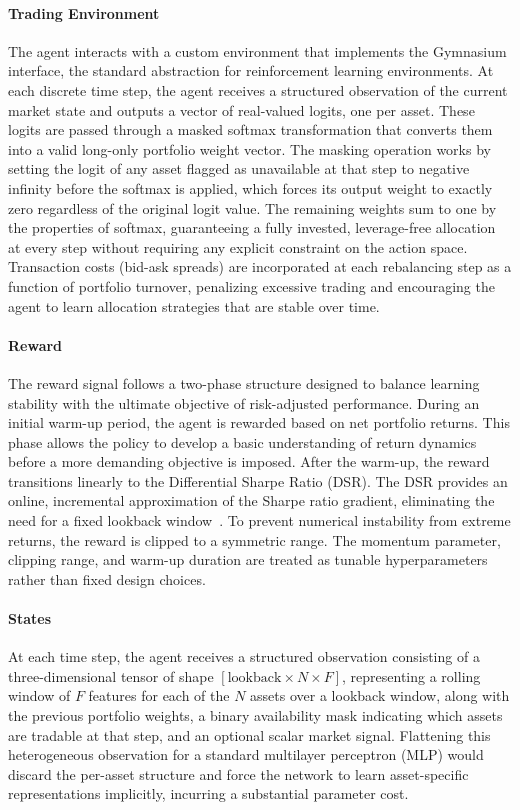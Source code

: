 \paragraph{Trading Environment} The agent interacts with a custom environment that implements the Gymnasium interface, the standard abstraction for reinforcement learning environments. At each discrete time step, the agent receives a structured observation of the current market state and outputs a vector of real-valued logits, one per asset. These logits are passed through a masked softmax transformation that converts them into a valid long-only portfolio weight vector. The masking operation works by setting the logit of any asset flagged as unavailable at that step to negative infinity before the softmax is applied, which forces its output weight to exactly zero regardless of the original logit value. The remaining weights sum to one by the properties of softmax, guaranteeing a fully invested, leverage-free allocation at every step without requiring any explicit constraint on the action space. Transaction costs (bid-ask spreads) are incorporated at each rebalancing step as a function of portfolio turnover, penalizing excessive trading and encouraging the agent to learn allocation strategies that are stable over time.

\paragraph{Reward} The reward signal follows a two-phase structure designed to balance learning stability with the ultimate objective of risk-adjusted performance. During an initial warm-up period, the agent is rewarded based on net portfolio returns. This phase allows the policy to develop a basic understanding of return dynamics before a more demanding objective is imposed. After the warm-up, the reward transitions linearly to the Differential Sharpe Ratio (DSR). The DSR provides an online, incremental approximation of the Sharpe ratio gradient, eliminating the need for a fixed lookback window~\cite{dsratio, 0df79}. To prevent numerical instability from extreme returns, the reward is clipped to a symmetric range. The momentum parameter, clipping range, and warm-up duration are treated as tunable hyperparameters rather than fixed design choices.

\paragraph{States} At each time step, the agent receives a structured observation consisting of a three-dimensional tensor of shape $[\text{lookback} \times N \times F]$, representing a rolling window of $F$ features for each of the $N$ assets over a lookback window, along with the previous portfolio weights, a binary availability mask indicating which assets are tradable at that step, and an optional scalar market signal. Flattening this heterogeneous observation for a standard multilayer perceptron (MLP) would discard the per-asset structure and force the network to learn asset-specific representations implicitly, incurring a substantial parameter cost.

